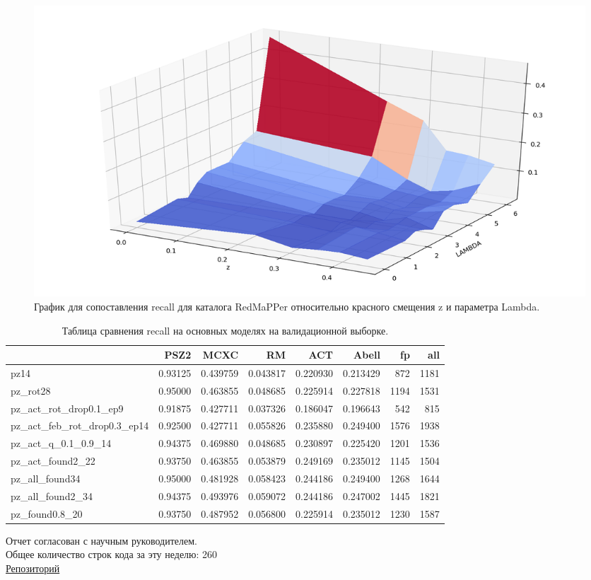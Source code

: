 \documentclass{article}
\begin{document}
\begin{figure}[h]
\includegraphics[width=0.8\linewidth]{lambda_3d}
\caption{График для сопоставления recall для каталога RedMaPPer относительно красного смещения z 
    и параметра Lambda.}
\label{Fig:Lambda}
\end{figure}

\begin{table}
\begin{tabular}{lrrrrrrr}
    \toprule
    {} &     PSZ2 &      MCXC &        RM &       ACT &     Abell &    fp &   all \\
    \midrule
    pz14                        &  0.93125 &  0.439759 &  0.043817 &  0.220930 &  0.213429 &   872 &  1181 \\
    pz\_rot28                    &  0.95000 &  0.463855 &  0.048685 &  0.225914 &  0.227818 &  1194 &  1531 \\
    pz\_act\_rot\_drop0.1\_ep9      &  0.91875 &  0.427711 &  0.037326 &  0.186047 &  0.196643 &   542 &   815 \\
    pz\_act\_feb\_rot\_drop0.3\_ep14 &  0.92500 &  0.427711 &  0.055826 &  0.235880 &  0.249400 &  1576 &  1938 \\
    pz\_act\_q\_0.1\_0.9\_14         &  0.94375 &  0.469880 &  0.048685 &  0.230897 &  0.225420 &  1201 &  1536 \\
    pz\_act\_found2\_22            &  0.93750 &  0.463855 &  0.053879 &  0.249169 &  0.235012 &  1145 &  1504 \\
    pz\_all\_found34              &  0.95000 &  0.481928 &  0.058423 &  0.244186 &  0.249400 &  1268 &  1644 \\
    pz\_all\_found2\_34            &  0.94375 &  0.493976 &  0.059072 &  0.244186 &  0.247002 &  1445 &  1821 \\
    pz\_found0.8\_20              &  0.93750 &  0.487952 &  0.056800 &  0.225914 &  0.235012 &  1230 &  1587 \\
\bottomrule
\end{tabular}
\caption{Таблица сравнения recall на основных моделях на валидационной выборке.}
\label{Tbl:Recall}
\end{table}

Отчет согласован с научным руководителем.\\
Общее количество строк кода за эту неделю: 260\\
\href{https://github.com/rt2122/data-segmentation-2}{Репозиторий}\\ 
\end{document}
